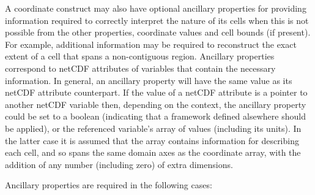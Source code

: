 A coordinate construct may also have optional ancillary properties for
providing information required to correctly interpret the nature of
its cells when this is not possible from the other properties,
coordinate values and cell bounds (if present). For example,
additional information may be required to reconstruct the exact extent
of a cell that spans a non-contiguous region. Ancillary properties
correspond to netCDF attributes of variables that contain the
necessary information. In general, an ancillary property will have the
same value as its netCDF attribute counterpart. If the value of a
netCDF attribute is a pointer to another netCDF variable then,
depending on the context, the ancillary property could be set to a
boolean (indicating that a framework defined alsewhere should be
applied), or the referenced variable's array of values (including its
units). In the latter case it is assumed that the array contains
information for describing each cell, and so spans the same domain
axes as the coordinate array, with the addition of any number
(including zero) of extra dimensions.

Ancillary properties are required in the following cases:

